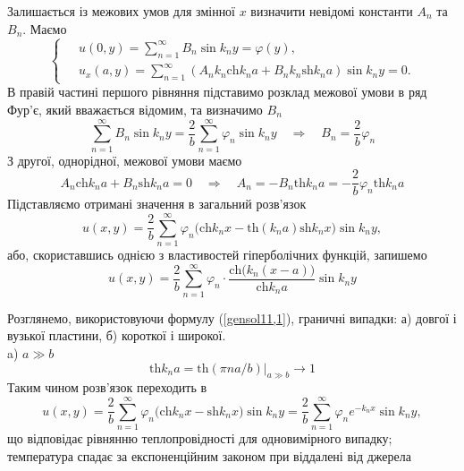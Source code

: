 Залишається із межових умов для змінної $x$ визначити невідомі константи $A_n$ та $B_n$. Маємо
\begin{equation}
    \left\{ \begin{aligned}
        \;&u(0,y) = \sum_{n=1}^{\infty} B_n \sin k_ny = \varphi(y),\\
          &u_x(a,y) = \sum_{n=1}^{\infty} \left(A_nk_n\mathrm{ch}k_na + B_nk_n\mathrm{sh}k_na\right) \sin k_ny = 0.
    \end{aligned} \right.
\end{equation}
В правій частині першого рівняння підставимо розклад межової умови в ряд Фур'є, який вважається відомим, та визначимо $B_n$
\begin{equation}
    \sum_{n=1}^{\infty} B_n \sin k_ny = \frac{2}{b} \sum_{n=1}^{\infty} \varphi_n \sin k_ny
    \quad\Rightarrow\quad 
    B_n = \frac{2}{b} \varphi_n
\end{equation} 
З другої, однорідної, межової умови маємо
\begin{equation}
    A_n\mathrm{ch}k_na + B_n\mathrm{sh}k_na = 0
    \quad\Rightarrow\quad
    A_n = - B_n \mathrm{th}k_na = -\frac{2}{b}\varphi_n \mathrm{th}k_na
\end{equation}
Підставляємо отримані значення в загальний розв'язок
\begin{equation} \label{gensol11,1}
    u(x,y) = \frac{2}{b}\sum_{n=1}^{\infty} \varphi_n \big(\mathrm{ch}k_nx - \mathrm{th}(k_na)\mathrm{sh}k_nx\big) \sin k_ny,
\end{equation}
або, скориставшись однією з властивостей гіперболічних функцій, запишемо
\begin{equation}
    u(x,y) = \frac{2}{b}\sum_{n=1}^{\infty} \varphi_n \cdot \frac{\mathrm{ch}\big(k_n(x-a)\big)}{\mathrm{ch}k_na} \sin k_ny
\end{equation}

Розглянемо, використовуючи формулу (\ref{gensol11,1}), граничні випадки: а) довгої і вузької пластини, б) короткої і широкої.\\
a) $a \gg b$
\begin{equation*}
    \mathrm{th}k_na = \mathrm{th}(\pi na/b)\bigg|_{a \gg b} \to 1
\end{equation*}
Таким чином розв'язок переходить в 
\begin{equation}
    u(x,y) = \frac{2}{b}\sum_{n=1}^{\infty} \varphi_n \big(\mathrm{ch}k_nx - \mathrm{sh}k_nx\big) \sin k_ny = \frac{2}{b}\sum_{n=1}^{\infty} \varphi_n e^{-k_nx} \sin k_ny,
\end{equation}
що відповідає рівнянню теплопровідності для одновимірного випадку; температура спадає за експоненційним законом при віддалені від джерела   

